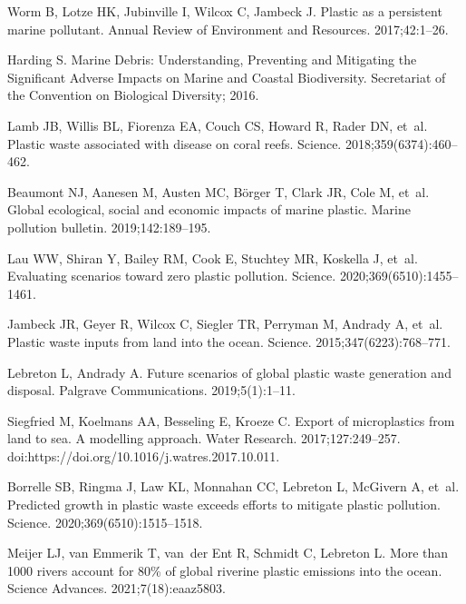 \documentclass[10pt,letterpaper]{article}
\begin{document}
\begin{thebibliography}{10}
Worm B, Lotze HK, Jubinville I, Wilcox C, Jambeck J.
\newblock Plastic as a persistent marine pollutant.
\newblock Annual Review of Environment and Resources. 2017;42:1--26.

Harding S.
\newblock Marine Debris: Understanding, Preventing and Mitigating the
  Significant Adverse Impacts on Marine and Coastal Biodiversity.
\newblock Secretariat of the Convention on Biological Diversity; 2016.

Lamb JB, Willis BL, Fiorenza EA, Couch CS, Howard R, Rader DN, et~al.
\newblock Plastic waste associated with disease on coral reefs.
\newblock Science. 2018;359(6374):460--462.

Beaumont NJ, Aanesen M, Austen MC, B{\"o}rger T, Clark JR, Cole M, et~al.
\newblock Global ecological, social and economic impacts of marine plastic.
\newblock Marine pollution bulletin. 2019;142:189--195.

Lau WW, Shiran Y, Bailey RM, Cook E, Stuchtey MR, Koskella J, et~al.
\newblock Evaluating scenarios toward zero plastic pollution.
\newblock Science. 2020;369(6510):1455--1461.

Jambeck JR, Geyer R, Wilcox C, Siegler TR, Perryman M, Andrady A, et~al.
\newblock Plastic waste inputs from land into the ocean.
\newblock Science. 2015;347(6223):768--771.

Lebreton L, Andrady A.
\newblock Future scenarios of global plastic waste generation and disposal.
\newblock Palgrave Communications. 2019;5(1):1--11.

Siegfried M, Koelmans AA, Besseling E, Kroeze C.
\newblock Export of microplastics from land to sea. A modelling approach.
\newblock Water Research. 2017;127:249--257.
\newblock doi:{https://doi.org/10.1016/j.watres.2017.10.011}.

Borrelle SB, Ringma J, Law KL, Monnahan CC, Lebreton L, McGivern A, et~al.
\newblock Predicted growth in plastic waste exceeds efforts to mitigate plastic
  pollution.
\newblock Science. 2020;369(6510):1515--1518.

Meijer LJ, van Emmerik T, van~der Ent R, Schmidt C, Lebreton L.
\newblock More than 1000 rivers account for 80\% of global riverine plastic
  emissions into the ocean.
\newblock Science Advances. 2021;7(18):eaaz5803.


\end{thebibliography}
\end{document}

